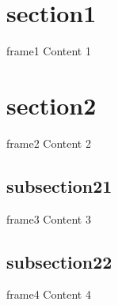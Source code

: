\documentclass{beamer}
\begin{document}
\section{section1}

\begin{frame}{frame1}
  Content 1
\end{frame}

\section{section2}

\begin{frame}{frame2}
  Content 2
\end{frame}

\subsection{subsection21}

\begin{frame}{frame3}
  Content 3
\end{frame}

\subsection{subsection22}

\begin{frame}{frame4}
  Content 4
\end{frame}
\end{document}
